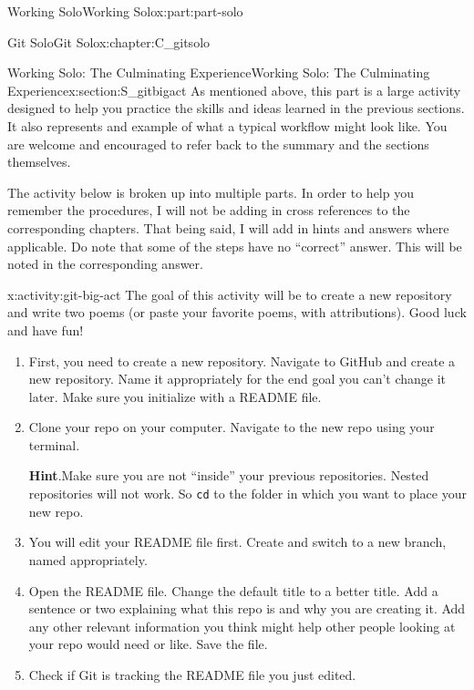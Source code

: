 \documentclass[oneside,10pt,]{book}
\newcommand{\blocktitlefont}{\relax}
\newcommand{\mono}[1]{\texttt{#1}}
\begin{document}
\begin{partptx}{Working Solo}{}{Working Solo}{}{}{x:part:part-solo}
\begin{chapterptx}{Git Solo}{}{Git Solo}{}{}{x:chapter:C_gitsolo}
\typeout{************************************************}
%
\begin{sectionptx}{Working Solo: The Culminating Experience}{}{Working Solo: The Culminating Experience}{}{}{x:section:S_gitbigact}
%
As mentioned above, this part is a large activity designed to help you practice the skills and ideas learned in the previous sections. It also represents and example of what a typical workflow might look like. You are welcome and encouraged to refer back to the summary and the sections themselves.%
\par
The activity below is broken up into multiple parts. In order to help you remember the procedures, I will not be adding in cross references to the corresponding chapters. That being said, I will add in hints and answers where applicable. Do note that some of the steps have no ``correct'' answer. This will be noted in the corresponding answer.%
\begin{activity}{}{x:activity:git-big-act}%
The goal of this activity will be to create a new repository and write two poems (or paste your favorite poems, with attributions). Good luck and have fun!%
\begin{enumerate}[font=\bfseries,label=(\alph*),ref=\alph*]
\item\label{x:task:git-ba-newrepo}First, you need to create a new repository. Navigate to GitHub and create a new repository. Name it appropriately for the end goal \textemdash{} you can't change it later. Make sure you initialize with a README file.%
\item\label{x:task:git-ba-clone}Clone your repo on your computer. Navigate to the new repo using your terminal.%
\par\smallskip%
\noindent\textbf{\blocktitlefont Hint}.\hypertarget{g:hint:idm479678936}{}\quad{}Make sure you are not ``inside'' your previous repositories. Nested repositories will not work. So \mono{cd} to the folder in which you want to place your new repo.%
\item{}You will edit your README file first. Create and switch to a new branch, named appropriately.%
\item{}Open the README file. Change the default title to a better title. Add a sentence or two explaining what this repo is and why you are creating it. Add any other relevant information you think might help other people looking at your repo would need or like. Save the file.%
\item{}Check if Git is tracking the README file you just edited.%

\end{enumerate}
\end{activity}
\end{sectionptx}
\end{chapterptx}
\end{partptx}
\end{document}
